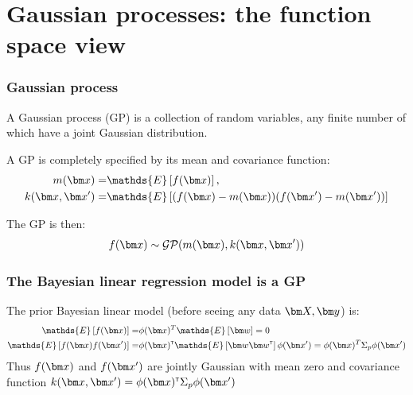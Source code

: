 \section{Gaussian processes: the function space view}
\begin{frame}
\frametitle{Gaussian process}
\begin{definition}
A \alert{Gaussian process (GP)} is a collection of random variables, any finite number of which have a joint Gaussian distribution.
\end{definition}

A GP is completely specified by its mean and covariance function:
\renewcommand\theequation{2.\thedefcounter}
\setcounter{defcounter}{13}
\begin{align*}
           m(\bx) =& \mathds{E} \left[ f(\bx) \right], \\
\nonumber{} k(\bx, \bx') =& \mathds{E} \left[ (f(\bx) - m(\bx)) (f(\bx') - m(\bx')) \right]  
\end{align*}

The GP is then:
\renewcommand\theequation{2.\thedefcounter}
\setcounter{defcounter}{14}
\begin{equation}
f(\bx) \sim \mathcal{GP}(m(\bx), k(\bx, \bx'))
\end{equation}

\end{frame}

\begin{frame}
\frametitle{The Bayesian linear regression model is a GP}
The prior Bayesian linear model (before seeing any data $\bX, \by$) is:
%
\renewcommand\theequation{2.\thedefcounter}
\setcounter{defcounter}{15}
\begin{align}
\mathds{E} \left[ f(\bx) \right] =& \phi(\bx)^T \mathds{E} \left[ \bw \right] = 0 \\
\nonumber{} \mathds{E} \left[ f(\bx) f(\bx') \right] =& \phi(\bx)\transpose \mathds{E} \left[ \bw \bw\transpose \right] \phi(\bx') =
\phi(\bx)^T \Sigma_p \phi(\bx')
\end{align}
%
Thus $f(\bx)$ and $f(\bx')$ are jointly Gaussian with mean zero and \alert{covariance function} $k(\bx, \bx') = \phi(\bx)\transpose \Sigma_p \phi(\bx')$
\end{frame}

